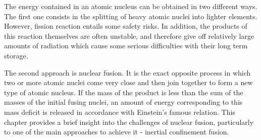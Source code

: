 The energy contained in an atomic nucleus can be obtained in two different ways. The first one consists in the splitting of heavy atomic nuclei into lighter elements. However, fission reaction entails some safety risks. In addition, the products of this reaction themselves are often unstable, and therefore give off relatively large amounts of radiation which cause some serious difficulties with their long term storage.

The second approach is nuclear fusion. It is the exact opposite process in which two or more atomic nuclei come very close and then join together to form a new type of atomic nucleus. If the mass of the product is less than the sum of the masses of the initial fusing nuclei, an amount of energy corresponding to this mass deficit is released in accordance with Einstein's famous relation. This chapter provides a brief insight into the challenges of nuclear fusion, particularly to one of the main approaches to achieve it - inertial confinement fusion.